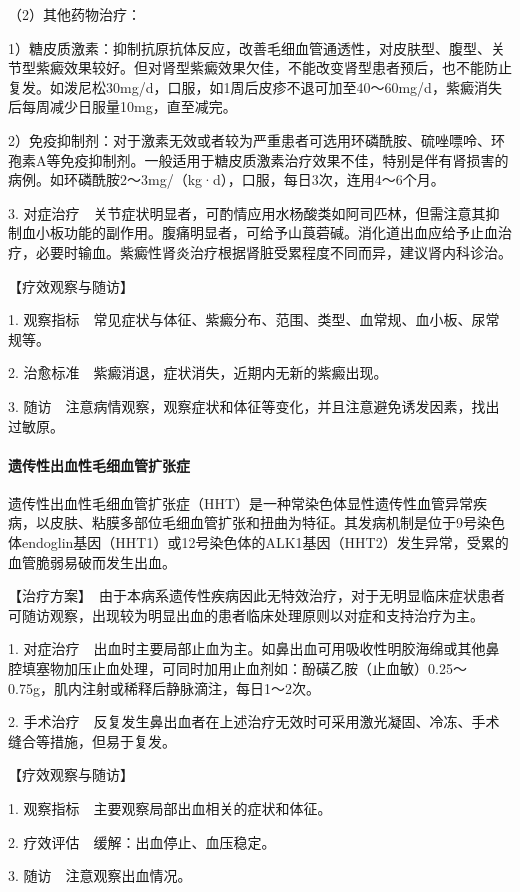 （2）其他药物治疗：

1）糖皮质激素：抑制抗原抗体反应，改善毛细血管通透性，对皮肤型、腹型、关节型紫癜效果较好。但对肾型紫癜效果欠佳，不能改变肾型患者预后，也不能防止复发。如泼尼松30mg/d，口服，如1周后皮疹不退可加至40～60mg/d，紫癜消失后每周减少日服量10mg，直至减完。

2）免疫抑制剂：对于激素无效或者较为严重患者可选用环磷酰胺、硫唑嘌呤、环孢素A等免疫抑制剂。一般适用于糖皮质激素治疗效果不佳，特别是伴有肾损害的病例。如环磷酰胺2～3mg/（kg·d），口服，每日3次，连用4～6个月。

3.
对症治疗　关节症状明显者，可酌情应用水杨酸类如阿司匹林，但需注意其抑制血小板功能的副作用。腹痛明显者，可给予山莨菪碱。消化道出血应给予止血治疗，必要时输血。紫癜性肾炎治疗根据肾脏受累程度不同而异，建议肾内科诊治。

【疗效观察与随访】

1.
观察指标　常见症状与体征、紫癜分布、范围、类型、血常规、血小板、尿常规等。

2. 治愈标准　紫癜消退，症状消失，近期内无新的紫癜出现。

3.
随访　注意病情观察，观察症状和体征等变化，并且注意避免诱发因素，找出过敏原。

\paragraph{遗传性出血性毛细血管扩张症}

遗传性出血性毛细血管扩张症（HHT）是一种常染色体显性遗传性血管异常疾病，以皮肤、粘膜多部位毛细血管扩张和扭曲为特征。其发病机制是位于9号染色体endoglin基因（HHT1）或12号染色体的ALK1基因（HHT2）发生异常，受累的血管脆弱易破而发生出血。

【治疗方案】　由于本病系遗传性疾病因此无特效治疗，对于无明显临床症状患者可随访观察，出现较为明显出血的患者临床处理原则以对症和支持治疗为主。

1.
对症治疗　出血时主要局部止血为主。如鼻出血可用吸收性明胶海绵或其他鼻腔填塞物加压止血处理，可同时加用止血剂如：酚磺乙胺（止血敏）0.25～0.75g，肌内注射或稀释后静脉滴注，每日1～2次。

2.
手术治疗　反复发生鼻出血者在上述治疗无效时可采用激光凝固、冷冻、手术缝合等措施，但易于复发。

【疗效观察与随访】

1. 观察指标　主要观察局部出血相关的症状和体征。

2. 疗效评估　缓解：出血停止、血压稳定。

3. 随访　注意观察出血情况。

